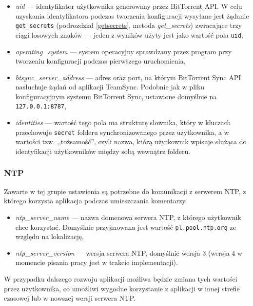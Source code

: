 \documentclass[polish,a4paper,twoside]{ppfcmthesis}
\begin{document}
\begin{itemize}[noitemsep]
  \item \emph{uid} --- identyfikator użytkownika generowany przez BitTorrent API. W celu uzyskania identyfikatora podczas tworzenia konfiguracji wysyłane jest żądanie \texttt{get\_secrets} (podrozdział \ref{getsecrets}, metoda \emph{get\_secrets}) zwracające trzy ciągi losowych znaków --- jeden z wyników użyty jest jako wartość pola \texttt{uid},
  
  \item \emph{operating\_system} --- system operacyjny sprawdzany przez program przy tworzeniu konfiguracji podczas pierwszego uruchomienia,
  
  \item \emph{btsync\_server\_address} --- adres oraz port, na którym BitTorrent Sync API nasłuchuje żądań od aplikacji TeamSync. Podobnie jak w pliku konfiguracyjnym systemu BitTorrent Sync, ustawione domyślnie na \texttt{127.0.0.1:8787},
  
  \item \emph{identities} --- wartość tego pola ma strukturę słownika, który w kluczach przechowuje \texttt{secret} folderu synchronizowanego przez użytkownika, a w wartości tzw. ,,tożsamość'', czyli nazwa, którą użytkownik wpisuje służąca do identyfikacji użytkowników między sobą wewnątrz folderu.
\end{itemize}

\subsubsection*{NTP}

Zawarte w tej grupie ustawienia są potrzebne do komunikacji z serwerem NTP, z którego korzysta aplikacja podczas umieszczania komentarzy.

\begin{itemize}[noitemsep]
  \item \emph{ntp\_server\_name} --- nazwa domenowa serwera NTP, z którego użytkownik chce korzystać. Domyślnie przyjmowana jest wartość \texttt{pl.pool.ntp.org} ze względu na lokalizację,
  \item \emph{ntp\_server\_version} --- wersja serwera NTP, domyślnie wersja $3$ (wersja $4$ w momencie pisania pracy jest w trakcie implementacji).
\end{itemize}

W przypadku dalszego rozwoju aplikacji możliwa będzie zmiana tych wartości przez użytkownika, co umożliwi wygodne korzystanie z aplikacji w innej strefie czasowej lub w nowszej wersji serwera NTP.
\end{document}
